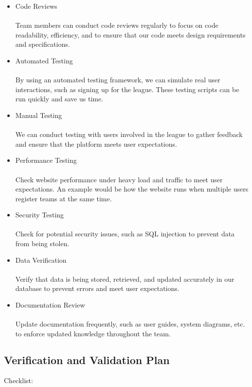\documentclass[12pt, titlepage]{article}
\begin{document}
\begin{itemize}
    \item Code Reviews
          \\ \\Team members can conduct code reviews regularly to focus on code readability, efficiency, and to ensure that our code meets design requirements and specifications.
    \item Automated Testing
          \\ \\By using an automated testing framework, we can simulate real user interactions, such as signing up for the league. These testing scripts can be run quickly and save us time.
    \item Manual Testing
          \\ \\ We can conduct testing with users involved in the league to gather feedback and ensure that the platform meets user expectations.
    \item Performance Testing
          \\ \\Check website performance under heavy load and traffic to meet user expectations. An example would be how the website runs when multiple users register teams at the same time.
    \item Security Testing
          \\ \\Check for potential security issues, such as SQL injection to prevent data from being stolen.
    \item Data Verification
          \\ \\Verify that data is being stored, retrieved, and updated accurately in our database to prevent errors and meet user expectations.
    \item Documentation Review
          \\ \\Update documentation frequently, such as user guides, system diagrams, etc. to enforce updated knowledge throughout the team.
\end{itemize}

\subsection{Verification and Validation Plan}

Checklist:
\end{document}
